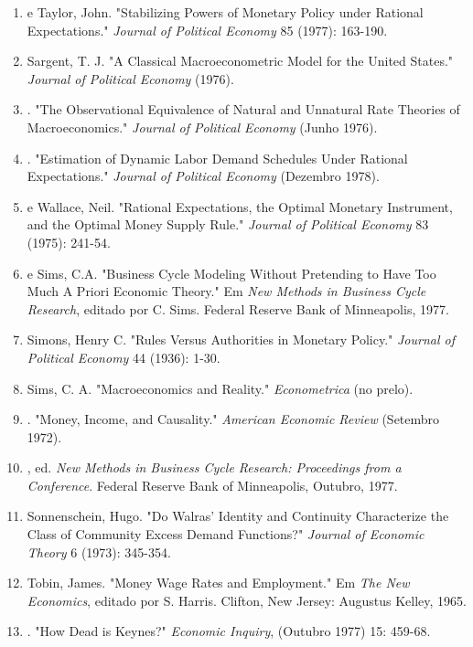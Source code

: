 \documentclass[12pt]{article}
\begin{document}
\begin{enumerate}
    \item[{[26]}] \underline{\hspace{1cm}} e Taylor, John. "Stabilizing Powers of Monetary Policy under Rational Expectations." \textit{Journal of Political Economy} 85 (1977): 163-190.
    \item[{[27]}] Sargent, T. J. "A Classical Macroeconometric Model for the United States." \textit{Journal of Political Economy} (1976).
    \item[{[28]}] \underline{\hspace{1cm}}. "The Observational Equivalence of Natural and Unnatural Rate Theories of Macroeconomics." \textit{Journal of Political Economy} (Junho 1976).
    \item[{[29]}] \underline{\hspace{1cm}}. "Estimation of Dynamic Labor Demand Schedules Under Rational Expectations." \textit{Journal of Political Economy} (Dezembro 1978).
    \item[{[30]}] \underline{\hspace{1cm}} e Wallace, Neil. "Rational Expectations, the Optimal Monetary Instrument, and the Optimal Money Supply Rule." \textit{Journal of Political Economy} 83 (1975): 241-54.
    \item[{[31]}] \underline{\hspace{1cm}} e Sims, C.A. "Business Cycle Modeling Without Pretending to Have Too Much A Priori Economic Theory." Em \textit{New Methods in Business Cycle Research}, editado por C. Sims. Federal Reserve Bank of Minneapolis, 1977.
    \item[{[32]}] Simons, Henry C. "Rules Versus Authorities in Monetary Policy." \textit{Journal of Political Economy} 44 (1936): 1-30.
    \item[{[33]}] Sims, C. A. "Macroeconomics and Reality." \textit{Econometrica} (no prelo).
    \item[{[34]}] \underline{\hspace{1cm}}. "Money, Income, and Causality." \textit{American Economic Review} (Setembro 1972).
    \item[{[35]}] \underline{\hspace{1cm}}, ed. \textit{New Methods in Business Cycle Research: Proceedings from a Conference}. Federal Reserve Bank of Minneapolis, Outubro, 1977.
    \item[{[36]}] Sonnenschein, Hugo. "Do Walras' Identity and Continuity Characterize the Class of Community Excess Demand Functions?" \textit{Journal of Economic Theory} 6 (1973): 345-354.
    \item[{[37]}] Tobin, James. "Money Wage Rates and Employment." Em \textit{The New Economics}, editado por S. Harris. Clifton, New Jersey: Augustus Kelley, 1965.
    \item[{[38]}] \underline{\hspace{1cm}}. "How Dead is Keynes?" \textit{Economic Inquiry}, (Outubro 1977) 15: 459-68.
\end{enumerate}
\end{document}
